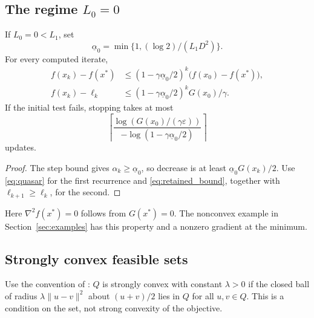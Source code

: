 \subsection{The regime \texorpdfstring{$L_0=0$}{L0=0}}
\begin{corollary}\label{cor:pure_gap_linear}
If $L_0=0<L_1$, set
\[
 \underline\alpha_0=\min\{1,(\log 2)/(L_1D^2)\}.
\]
For every computed iterate,
\begin{align*}
 f(x_k)-f(x^*)&\le
 (1-\gamma\underline\alpha_0/2)^k\bigl(f(x_0)-f(x^*)\bigr),\\
 f(x_k)-\ell_k&\le
 (1-\gamma\underline\alpha_0/2)^k G(x_0)/\gamma.
\end{align*}
If the initial test fails, stopping takes at most
\[
 \left\lceil\frac{\log(G(x_0)/(\gamma\varepsilon))}
 {-\log(1-\gamma\underline\alpha_0/2)}\right\rceil
\]
updates.
\end{corollary}
\begin{proof}
The step bound gives $\alpha_k\ge\underline\alpha_0$, so decrease
is at least $\underline\alpha_0G(x_k)/2$.
Use \eqref{eq:quasar} for the first recurrence and
\eqref{eq:retained_bound}, together with $\ell_{k+1}\ge\ell_k$,
for the second.
\end{proof}
Here $\nabla^2f(x^*)=0$ follows from $G(x^*)=0$.
The nonconvex example in Section~\ref{sec:examples} has this property
and a nonzero gradient at the minimum.

\subsection{Strongly convex feasible sets}
Use the convention of \cite{vyguzov}: $Q$ is strongly convex with
constant $\lambda>0$ if the closed ball of radius
$\lambda\|u-v\|^2$ about $(u+v)/2$ lies in $Q$ for all $u,v\in Q$.
This is a condition on the set, not strong convexity of the objective.

